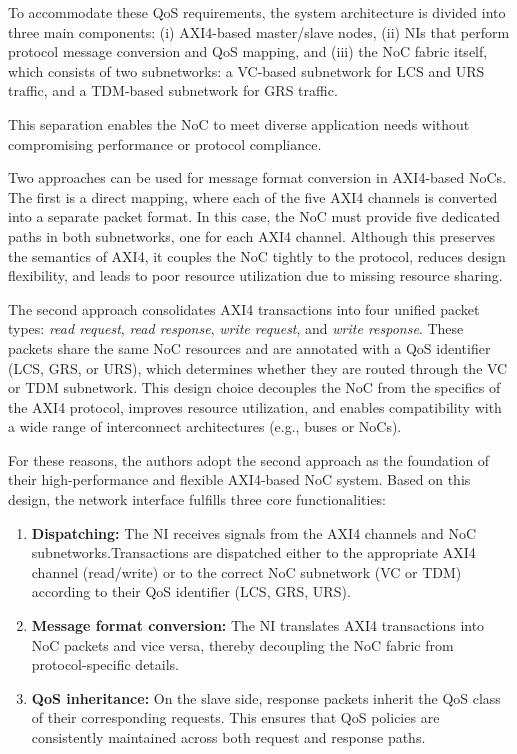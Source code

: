 To accommodate these QoS requirements, the system architecture is divided into three main components: (i) AXI4-based master/slave nodes, (ii) \acp{NI} that perform protocol message conversion and QoS mapping, and (iii) the \ac{NoC} fabric itself, which consists of two subnetworks: a VC-based subnetwork for LCS and URS traffic, and a TDM-based subnetwork for GRS traffic. 

This separation enables the NoC to meet diverse application needs without compromising performance or protocol compliance.


Two approaches can be used for message format conversion in AXI4-based NoCs. The first is a direct mapping, where each of the five AXI4 channels is converted into a separate packet format. In this case, the NoC must provide five dedicated paths in both subnetworks, one for each AXI4 channel. Although this preserves the semantics of AXI4, it couples the NoC tightly to the protocol, reduces design flexibility, and leads to poor resource utilization due to missing resource sharing.

The second approach consolidates AXI4 transactions into four unified packet types: \textit{read request}, \textit{read response}, \textit{write request}, and \textit{write response}. These packets share the same NoC resources and are annotated with a QoS identifier (\ac{LCS}, \ac{GRS}, or \ac{URS}), which determines whether they are routed through the VC or TDM subnetwork. This design choice decouples the NoC from the specifics of the AXI4 protocol, improves resource utilization, and enables compatibility with a wide range of interconnect architectures (e.g., buses or NoCs).

For these reasons, the authors adopt the second approach as the foundation of their high-performance and flexible AXI4-based NoC system. Based on this design, the network interface fulfills three core functionalities:
\begin{enumerate}
    \item \textbf{Dispatching:} The NI receives signals from the AXI4 channels and NoC subnetworks.Transactions are dispatched either to the appropriate AXI4 channel (read/write) or to the correct NoC subnetwork (VC or TDM) according to their QoS identifier (\ac{LCS}, \ac{GRS}, \ac{URS}).
    \item \textbf{Message format conversion:} The NI translates AXI4 transactions into NoC packets and vice versa, thereby decoupling the NoC fabric from protocol-specific details.
    \item \textbf{QoS inheritance:} On the slave side, response packets inherit the QoS class of their corresponding requests. This ensures that QoS policies are consistently maintained across both request and response paths.
\end{enumerate}

